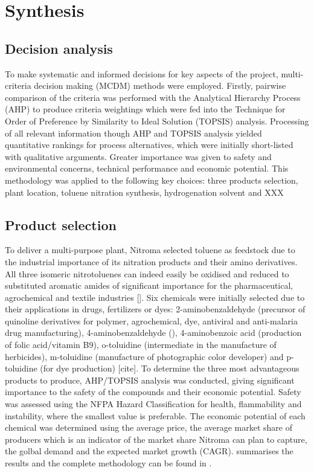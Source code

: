\section{Synthesis}
\label{sec:synthesis}
\subsection{Decision analysis}
To make systematic and informed decisions for key aspects of the project, multi-criteria decision making (MCDM) methods were employed. Firstly, pairwise comparison of the criteria was performed with the Analytical Hierarchy Process (AHP) to produce criteria weightings which were fed into the Technique for Order of Preference by Similarity to Ideal Solution (TOPSIS) analysis. Processing of all relevant information though AHP and TOPSIS analysis yielded quantitative rankings for process alternatives, which were initially short-listed with qualitative arguments. Greater importance was given to safety and environmental concerns, technical performance and economic potential.
This methodology was applied to the following key choices: three products selection, plant location, toluene nitration synthesis, hydrogenation solvent and XXX 

\subsection{Product selection}
To deliver a multi-purpose plant, Nitroma selected toluene as feedstock due to the industrial importance of its nitration products and their amino derivatives. All three isomeric nitrotoluenes can indeed easily be oxidised and reduced to substituted aromatic amides of significant importance for the pharmaceutical, agrochemical and textile industries []. Six chemicals were initially selected due to their applications in drugs, fertilizers or dyes: 2-aminobenzaldehyde (precursor of quinoline derivatives for polymer, agrochemical, dye, antiviral and anti-malaria drug manufacturing), 4-aminobenzaldehyde (), 4-aminobenzoic acid (production of folic acid/vitamin B9), o-toluidine (intermediate in the manufacture of herbicides), m-toluidine (manufacture of  photographic color developer) and p-toluidine (for dye production) [cite]. To determine the three most advantageous products to produce, AHP/TOPSIS analysis was conducted, giving significant importance to the safety of the compounds and their economic potential. Safety was assessed using the NFPA Hazard Classification for health, flammability and instability, where the smallest value is preferable. The economic potential of each chemical was determined using the average price, the average market share of producers which is an indicator of the market share Nitroma can plan to capture, the golbal demand and the expected market growth (CAGR).  summarises the results and the complete methodology can be found in .   


